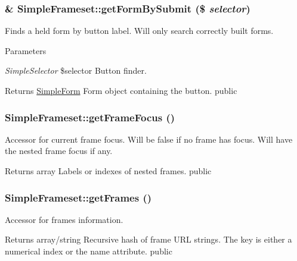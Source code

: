 \hypertarget{class_simple_frameset_a53a0a27d308d7606d2b306d6424875e2}{
\subsubsection[{getFormBySubmit}]{\setlength{\rightskip}{0pt plus 5cm}\& SimpleFrameset::getFormBySubmit (\$ {\em selector})}}
\label{class_simple_frameset_a53a0a27d308d7606d2b306d6424875e2}
Finds a held form by button label. Will only search correctly built forms. 
\begin{DoxyParams}{Parameters}
\item[{\em SimpleSelector}]\$selector Button finder. \end{DoxyParams}
\begin{DoxyReturn}{Returns}
\hyperlink{class_simple_form}{SimpleForm} Form object containing the button.  public 
\end{DoxyReturn}
\hypertarget{class_simple_frameset_a5f18f98fa0a35bedbc8d218f864b0cc3}{
\subsubsection[{getFrameFocus}]{\setlength{\rightskip}{0pt plus 5cm}SimpleFrameset::getFrameFocus ()}}
\label{class_simple_frameset_a5f18f98fa0a35bedbc8d218f864b0cc3}
Accessor for current frame focus. Will be false if no frame has focus. Will have the nested frame focus if any. \begin{DoxyReturn}{Returns}
array Labels or indexes of nested frames.  public 
\end{DoxyReturn}
\hypertarget{class_simple_frameset_a144edf4c75dcf8b6511e91ad9afebb6d}{
\subsubsection[{getFrames}]{\setlength{\rightskip}{0pt plus 5cm}SimpleFrameset::getFrames ()}}
\label{class_simple_frameset_a144edf4c75dcf8b6511e91ad9afebb6d}
Accessor for frames information. \begin{DoxyReturn}{Returns}
array/string Recursive hash of frame URL strings. The key is either a numerical index or the name attribute.  public 
\end{DoxyReturn}
